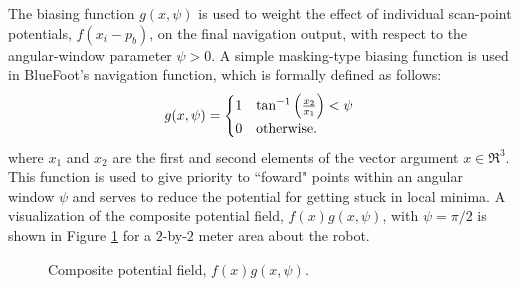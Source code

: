 			The biasing function $g(x,\psi)$ is used to weight the effect of individual scan-point potentials, $f(x_{i}-p_{b})$, on the final navigation output, with respect to the angular-window parameter $\psi>0$. A simple masking-type biasing function is used in BlueFoot's navigation function, which is formally defined as follows:
				\begin{equation}
					g(x,\psi) = 
					\begin{cases}
					1	& \tan^{-1}\left( \frac{x_{2}}{x_{1}} \right) < \psi \\
					0 	& \text{otherwise}.
					\end{cases}
				\end{equation}
			where $x_{1}$ and $x_{2}$ are the first and second elements of the vector argument $x\in\Re^{3}$. This function is used to give priority to ``foward" points within an angular window $\psi$ and serves to reduce the potential for getting stuck in local minima. A visualization of  the composite potential field, $f(x)g(x,\psi)$, with $\psi=\pi/2$ is shown in Figure \ref{fig::potential_field} for a $2$-by-$2$ meter area about the robot.
							\begin{figure}[t!]
								\centering
								\caption{Composite potential field, $f(x)g(x,\psi)$.}
								\label{fig::potential_field}
							\end{figure}

